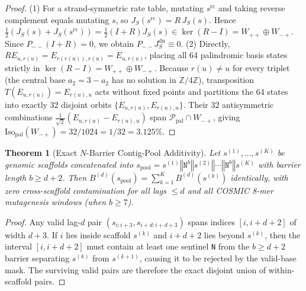 \documentclass[11pt,a4paper]{article}
\renewcommand{\_}{\origunderscore\penalty200\relax}
\newtheorem{theorem}{Theorem}[section]
\theoremstyle{remark}
\begin{document}
\begin{proof}
(1) For a strand-symmetric rate table, mutating $s^{\mathrm{rc}}$ and taking reverse complement equals mutating $s$, so $J_S(s^{\mathrm{rc}}) = R\,J_S(s)$.
Hence $\frac{1}{2}(J_S(s) + J_S(s^{\mathrm{rc}})) = \frac{1}{2}(I + R) J_S(s) \in \ker(R - I) = W_{++} \oplus W_{-+}$.
Since $P_{--}(I + R) = 0$, we obtain $P_{--} J_S^{\mathrm{dn}} \equiv 0$.
(2) Directly, $R E_{u, r(u)} = E_{r(r(u)), r(u)} = E_{u, r(u)}$, placing all 64 palindromic basis states strictly in $\ker(R - I) = W_{++} \oplus W_{-+}$. Because $r(u) \ne u$ for every triplet (the central base $a_2 = 3 - a_2$ has no solution in $\mathbb{Z}/4\mathbb{Z}$), transposition $T(E_{u,r(u)}) = E_{r(u),u}$ acts without fixed points and partitions the 64 states into exactly $32$ disjoint orbits $\{E_{u,r(u)}, E_{r(u),u}\}$. Their $32$ antisymmetric combinations $\frac{1}{\sqrt{2}}(E_{u,r(u)} - E_{r(u),u})$ span $\mathcal{P}_{\mathrm{pal}} \cap W_{-+}$, giving $\mathrm{Iso}_{\mathrm{pal}}(W_{-+}) = 32/1024 = 1/32 = 3.125\%$.
\end{proof}

\begin{theorem}[Exact $N$-Barrier Contig-Pool Additivity]
\label{thm:nbarrier}
Let $s^{(1)}, \dots, s^{(K)}$ be genomic scaffolds concatenated into $s_{\mathrm{pool}} = s^{(1)} \mathbin{\Vert} \mathtt{N}^b \mathbin{\Vert} s^{(2)} \mathbin{\Vert} \cdots \mathbin{\Vert} \mathtt{N}^b \mathbin{\Vert} s^{(K)}$ with barrier length $b \ge d + 2$.
Then $B^{(d)}(s_{\mathrm{pool}}) = \sum_{k=1}^K B^{(d)}(s^{(k)})$ identically, with zero cross-scaffold contamination for all lags $\le d$ and all COSMIC 8-mer mutagenesis windows (when $b \ge 7$).
\end{theorem}

\begin{proof}
Any valid lag-$d$ pair $(s_{i:i+3}, s_{i+d:i+d+3})$ spans indices $[i, i+d+2]$ of width $d+3$.
If $i$ lies inside scaffold $s^{(k)}$ and $i+d+2$ lies beyond $s^{(k)}$, then the interval $[i, i+d+2]$ must contain at least one sentinel \texttt{N} from the $b \ge d+2$ barrier separating $s^{(k)}$ from $s^{(k+1)}$, causing it to be rejected by the valid-base mask.
The surviving valid pairs are therefore the exact disjoint union of within-scaffold pairs.
\end{proof}
\end{document}
